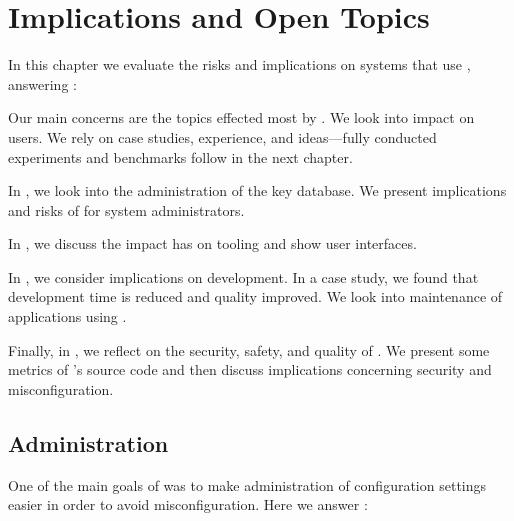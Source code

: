 \chapter{Implications and Open Topics}
\label{chapter:implications}


\chapterhung

In this chapter we evaluate the risks and implications on systems that use \elektra{}, answering :
\rqImplication*

Our main concerns are the topics effected most by \elektra{}.
We look into impact on users.
We rely on case studies, experience, and ideas---fully conducted experiments and benchmarks follow in the next chapter.

In , we look into the administration of the key database.
We present implications and risks of  for system administrators.

In , we discuss the impact \elektra{} has on tooling and show user interfaces.


In , we consider implications on development.
In a case study, we found that development time is reduced and quality improved.
We look into maintenance of applications using \elektra{}.


Finally, in , we reflect on the security, safety, and quality of \elektra{}.
We present some metrics of \elektra{}'s source code and then discuss implications concerning security and misconfiguration.


















\section{Administration}
\label{sec:administer}

One of the main goals of \elektra{} was to make administration of configuration settings easier in order to avoid misconfiguration.
Here we answer :
\rqImplicationAdministration*


